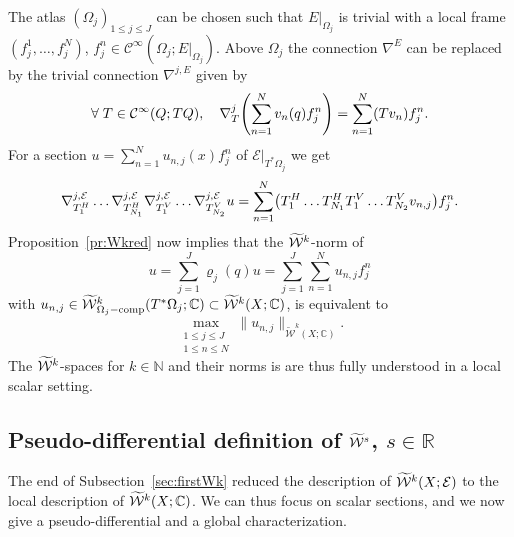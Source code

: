 \documentclass[AHL,Unicode,longabstracts]{cedram}
\newcommand{\C}{\mathbb{C}}
\newcommand{\R}{\mathbb{R}}
\newcommand{\N}{\mathbb{N}}
\newcommand{\clW}{\mathcal{W}}
\newcommand{\clC}{\mathcal{C}}
\newcommand{\clE}{\mathcal{E}}
\DeclareMathOperator{\ccomp}{comp}
\let\oldtilde\tilde
\renewcommand*{\tilde}[1]{\mathchoice{\widetilde{#1}}{\widetilde{#1}}{\oldtilde{#1}}{\oldtilde{#1}}}
\let\oldforall\forall
\renewcommand*{\forall}{\mathrel{\oldforall}}
\let\originalleft\left
\let\originalright\right
\renewcommand{\left}{\mathopen{}\mathclose\bgroup\originalleft}
\renewcommand{\right}{\aftergroup\egroup\originalright}
\begin{document}
The atlas $(\Omega_{j})_{1\leq j\leq J}$ can be chosen such that $E|_{\Omega_{j}}$ is trivial with a local frame $(f_{j}^{1},\dots,f_{j}^{N})$, $f_{j}^{n}\in \clC^{\infty}(\Omega_{j};E|_{\Omega_{j}})$. Above $\Omega_{j}$ the connection $\nabla^{E}$ can be replaced by the trivial connection $\nabla^{j,E}$ given by
\[
\forall T\in \clC^{\infty}(Q;TQ),\quad \nabla^{j}_{T}\left(\sum_{n=1}^{N}v_{n}(q)f_{j}^{n}\right)=\sum_{n=1}^{N}(Tv_{n})f_{j}^{n}.
\]
For a section $u=\sum_{n=1}^{N}u_{n,j}(x)f_{j}^{n}$ of $\clE|_{T^{*}\Omega_{j}}$ we get
\[
\nabla^{j,\clE}_{T_{1}^{H}}\dots \nabla^{j,\clE}_{T_{N_{1}}^{H}}
\nabla^{j,\clE}_{T_{1}^{V}}\dots \nabla^{j,\clE}_{T_{N_{2}}^{V}}u=
\sum_{n=1}^{N}\left(T_{1}^{H}\dots T_{N_{1}}^{H}T_{1}^{V}\dots T_{N_{2}}^{V}v_{n,j}\right)f^{n}_{j}.
\]
Proposition~\ref{pr:Wkred} now implies that the $\tilde{\clW}^{k}$-norm of
\[
u=\sum_{j=1}^{J}\varrho_{j}(q)u=\sum_{j=1}^{J}\sum_{n=1}^{N}u_{n,j}f^{n}_{j}
\]
with $u_{n,j}\in \tilde{\clW}^{k}_{\Omega_{j}-\ccomp}(T^{*}\Omega_{j};\C)\subset \tilde{\clW}^{k}(X;\C)$, is equivalent to
\[
\max_{\substack{1\leq j\leq J\\ 1\leq n\leq N}}\|u_{n,j}\|_{\widetilde{\clW}^{k}(X;\C)}.
\]
The $\tilde{\clW}^{k}$-spaces for $k\in \N$ and their norms is are thus fully understood in a local scalar setting.

\subsection{Pseudo-differential definition of \texorpdfstring{$\tilde{\clW}^{s}$}{W\^s}, \texorpdfstring{$s\in \R$}{s in R}}\label{sec:pseudWs}

The end of Subsection~\ref{sec:firstWk} reduced the description of $\tilde{\clW}^{k}(X;\clE)$ to the local description of $\tilde{\clW}^{k}(X;\C)$. We can thus focus on scalar sections, and we now give a pseudo-differential and a global characterization.
\end{document}
